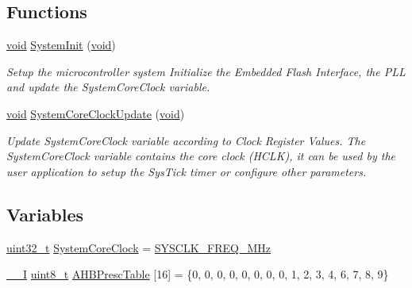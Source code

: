 \subsection*{Functions}
\begin{DoxyCompactItemize}
\item 
\hyperlink{usb__devapi_8h_afabf60e7f57651d6d595a02c75f07cd0}{void} \hyperlink{group___s_t_m32_f10x___system___private___functions_ga93f514700ccf00d08dbdcff7f1224eb2}{System\+Init} (\hyperlink{usb__devapi_8h_afabf60e7f57651d6d595a02c75f07cd0}{void})
\begin{DoxyCompactList}\small\item\em Setup the microcontroller system Initialize the Embedded Flash Interface, the P\+LL and update the System\+Core\+Clock variable. \end{DoxyCompactList}\item 
\hyperlink{usb__devapi_8h_afabf60e7f57651d6d595a02c75f07cd0}{void} \hyperlink{group___s_t_m32_f10x___system___private___functions_gae0c36a9591fe6e9c45ecb21a794f0f0f}{System\+Core\+Clock\+Update} (\hyperlink{usb__devapi_8h_afabf60e7f57651d6d595a02c75f07cd0}{void})
\begin{DoxyCompactList}\small\item\em Update System\+Core\+Clock variable according to Clock Register Values. The System\+Core\+Clock variable contains the core clock (H\+C\+LK), it can be used by the user application to setup the Sys\+Tick timer or configure other parameters. \end{DoxyCompactList}\end{DoxyCompactItemize}
\subsection*{Variables}
\begin{DoxyCompactItemize}
\item 
\hyperlink{_p_e___types_8h_a33594304e786b158f3fb30289278f5af}{uint32\+\_\+t} \hyperlink{group___s_t_m32_f10x___system___private___variables_gaa3cd3e43291e81e795d642b79b6088e6}{System\+Core\+Clock} = \hyperlink{group___s_t_m32_f10x___system___private___defines_ga69649cc38f34627cfb48b51062ebd390}{S\+Y\+S\+C\+L\+K\+\_\+\+F\+R\+E\+Q\+\_\+M\+Hz}
\item 
\hyperlink{group___c_m_s_i_s___c_m3__core__definitions_gaf63697ed9952cc71e1225efe205f6cd3}{\+\_\+\+\_\+I} \hyperlink{_p_e___types_8h_aba7bc1797add20fe3efdf37ced1182c5}{uint8\+\_\+t} \hyperlink{group___s_t_m32_f10x___system___private___variables_gacdc3ef54c0704c90e69a8a84fb2d970d}{A\+H\+B\+Presc\+Table} \mbox{[}16\mbox{]} = \{0, 0, 0, 0, 0, 0, 0, 0, 1, 2, 3, 4, 6, 7, 8, 9\}
\end{DoxyCompactItemize}
